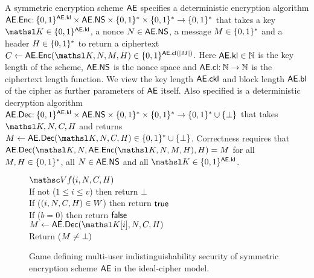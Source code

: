  A symmetric encryption scheme $\mathsf{AE}$ specifies a 
deterministic encryption algorithm $\mathsf{AE}.\mathsf{Enc}  \allowbreak  {:\:}  \allowbreak  \{0,1\}^{\mathsf{AE}.\mathsf{kl}}  \allowbreak \times \allowbreak   \mathsf{AE}.\mathsf{NS}  \allowbreak  \times  \allowbreak  \{0,1\}^*  \allowbreak \times \{0,1\}^* \to \{0,1\}^*$ that takes a key $\nkey \in \bits^{\sekl}$, a nonce $N \in \mathsf{AE}.\mathsf{NS}$, a message $M\in\{0,1\}^*$ and a header $H\in\{0,1\}^*$ to return a ciphertext 
$
  \ciph \gets \allowbreak \seEnc(\nkey,\allowbreak \iv,\allowbreak \msg,\header) \allowbreak \in \allowbreak \bits^{\SEcl(|\msg|)}
$.
Here $\mathsf{AE}.\mathsf{kl}\in{{\mathbb N}}$ is the key length of the scheme, $\mathsf{AE}.\mathsf{NS}$ is the nonce space and $\mathsf{AE}.\mathsf{cl}{:\:}{{\mathbb N}}\to{{\mathbb N}}$ is the ciphertext length function.  We view the key length $\mathsf{AE}.\mathsf{ckl}$ and block length $\mathsf{AE}.\mathsf{bl}$ of the cipher as further parameters of $\mathsf{AE}$ itself. Also specified is a deterministic decryption algorithm $\mathsf{AE}.\mathsf{Dec} {:\:} \{0,1\}^{\mathsf{AE}.\mathsf{kl}}\times \mathsf{AE}.\mathsf{NS} \times \{0,1\}^* \times \{0,1\}^* \to \{0,1\}^*\cup\{\bot\}$  that takes $\nkey,\iv,\ciph,\header$ and returns $\msg \gets \seDec(\nkey,\iv,\ciph,\header) \in \bits^*\cup\{\bot\}$. Correctness requires that $\seDec(\nkey,\iv,\seEnc(\nkey,\iv,\msg,\header),\header) = \msg$ for all $M,H \in \{0,1\}^*$, all $N\in\mathsf{AE}.\mathsf{NS}$ and all $\nkey \in\bits^{\sekl}$.

\begin{figure} [t]
{
\underline{$\VfO(i,\iv,\ciph,\header)$}\\[2pt]
If not ($1\leq i\leq v$) then return $\bot$ \\
If ($(i,N,C,H) \in W$) then return $\mathsf{true}$ \\ 
If ($b=0$) then return $\mathsf{false}$ \\
$\msg \gets \seDec(\nkey[i],\iv,\ciph,\header)$ \\
Return ($M\neq\bot)$ \medskip


}
\vspace{-2ex}
\caption{Game defining multi-user indistinguishability security of symmetric encryption scheme $\mathsf{AE}$ in the ideal-cipher model.}
\label{fig-ind}
\hrulefill
\end{figure}


